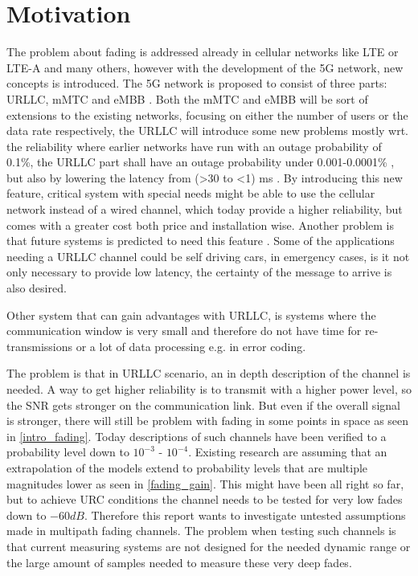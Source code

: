 \section{Motivation}

The problem about fading is addressed already in cellular networks like \gls{LTE} or \gls{LTE-A} and many others, however with the development of the 5G network, new concepts is introduced. The 5G network is proposed to consist of three parts: \Gls{URLLC}, \gls{mMTC} and \gls{eMBB} \citep{5G}. Both the \gls{mMTC} and \gls{eMBB} will be sort of extensions to the existing networks, focusing on either the number of users or the data rate respectively, the \gls{URLLC} will introduce some new problems mostly wrt. the reliability where earlier networks have run with an outage probability of 0.1\%, the URLLC part shall have an outage probability under 0.001-0.0001\% \citep{LTE,Petar5G}, but also by lowering the latency from (>30 to <1) ms \citep{LTE,5G_Latency}. By introducing this new feature, critical system with special needs might be able to use the cellular network instead of a wired channel, which today provide a higher reliability, but comes with a greater cost both price and installation wise. Another problem is that future systems is predicted to need this feature \citep{Petar5G}. %
Some of the applications needing a URLLC channel could be self driving cars, in emergency cases, is it not only necessary to provide low latency, the certainty of the message to arrive is also desired. %

Other system that can gain advantages with URLLC, is systems where the communication window is very small and therefore do not have time for re-transmissions or a lot of data processing e.g. in error coding.


The problem is that in URLLC scenario, an in depth description of the channel is needed. A way to get higher reliability is to transmit with a higher power level, so the \gls{SNR} gets stronger on the communication link. But even if the overall signal is stronger, there will still be problem with fading in some points in space as seen in \autoref{intro_fading}. Today descriptions of such channels have been verified to a probability level down to $10^{-3}$ - $10^{-4}$. Existing research are assuming that an extrapolation of the models extend to probability levels that are multiple magnitudes lower as seen in \autoref{fading_gain}. This might have been all right so far, but to achieve URC conditions the channel needs to be tested for very low fades down to $-60dB$. Therefore this report wants to investigate untested assumptions made in multipath fading channels. The problem when testing such channels is that current measuring systems are not designed for the needed dynamic range or the large amount of samples needed to measure these very deep fades. 

